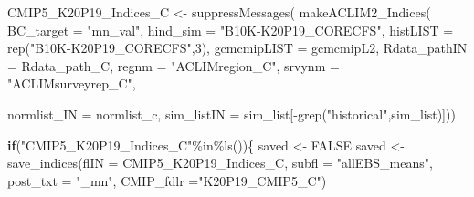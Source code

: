 \documentclass[
]{article}
\newenvironment{Shaded}{\begin{snugshade}}{\end{snugshade}}
\newcommand{\AttributeTok}[1]{\textcolor[rgb]{0.77,0.63,0.00}{#1}}
\newcommand{\ConstantTok}[1]{\textcolor[rgb]{0.00,0.00,0.00}{#1}}
\newcommand{\ControlFlowTok}[1]{\textcolor[rgb]{0.13,0.29,0.53}{\textbf{#1}}}
\newcommand{\DecValTok}[1]{\textcolor[rgb]{0.00,0.00,0.81}{#1}}
\newcommand{\FunctionTok}[1]{\textcolor[rgb]{0.00,0.00,0.00}{#1}}
\newcommand{\NormalTok}[1]{#1}
\newcommand{\OtherTok}[1]{\textcolor[rgb]{0.56,0.35,0.01}{#1}}
\newcommand{\SpecialCharTok}[1]{\textcolor[rgb]{0.00,0.00,0.00}{#1}}
\newcommand{\StringTok}[1]{\textcolor[rgb]{0.31,0.60,0.02}{#1}}
\begin{document}
\begin{Shaded}
\begin{Highlighting}[]
\NormalTok{    CMIP5\_K20P19\_Indices\_C }\OtherTok{\textless{}{-}} \FunctionTok{suppressMessages}\NormalTok{(}
                        \FunctionTok{makeACLIM2\_Indices}\NormalTok{(}
                        \AttributeTok{BC\_target =} \StringTok{"mn\_val"}\NormalTok{,}
                        \AttributeTok{hind\_sim  =}  \StringTok{"B10K{-}K20P19\_CORECFS"}\NormalTok{,}
                        \AttributeTok{histLIST  =} \FunctionTok{rep}\NormalTok{(}\StringTok{"B10K{-}K20P19\_CORECFS"}\NormalTok{,}\DecValTok{3}\NormalTok{),}
                        \AttributeTok{gcmcmipLIST =}\NormalTok{ gcmcmipL2,}
                         \AttributeTok{Rdata\_pathIN =}\NormalTok{ Rdata\_path\_C,}
                        \AttributeTok{regnm     =} \StringTok{"ACLIMregion\_C"}\NormalTok{,}
                        \AttributeTok{srvynm    =} \StringTok{"ACLIMsurveyrep\_C"}\NormalTok{,}
  
                        \AttributeTok{normlist\_IN =}\NormalTok{ normlist\_c,}
                        \AttributeTok{sim\_listIN =}\NormalTok{ sim\_list[}\SpecialCharTok{{-}}\FunctionTok{grep}\NormalTok{(}\StringTok{"historical"}\NormalTok{,sim\_list)]))}
    
    \ControlFlowTok{if}\NormalTok{(}\StringTok{"CMIP5\_K20P19\_Indices\_C"}\SpecialCharTok{\%in\%}\FunctionTok{ls}\NormalTok{())\{}
\NormalTok{      saved }\OtherTok{\textless{}{-}} \ConstantTok{FALSE}
\NormalTok{      saved }\OtherTok{\textless{}{-}} \FunctionTok{save\_indices}\NormalTok{(}\AttributeTok{flIN =}\NormalTok{ CMIP5\_K20P19\_Indices\_C, }
                     \AttributeTok{subfl =} \StringTok{"allEBS\_means"}\NormalTok{,}
                     \AttributeTok{post\_txt =} \StringTok{"\_mn"}\NormalTok{,}
                     \AttributeTok{CMIP\_fdlr =}\StringTok{"K20P19\_CMIP5\_C"}\NormalTok{)}
        

\end{Highlighting}
\end{Shaded}
\end{document}
